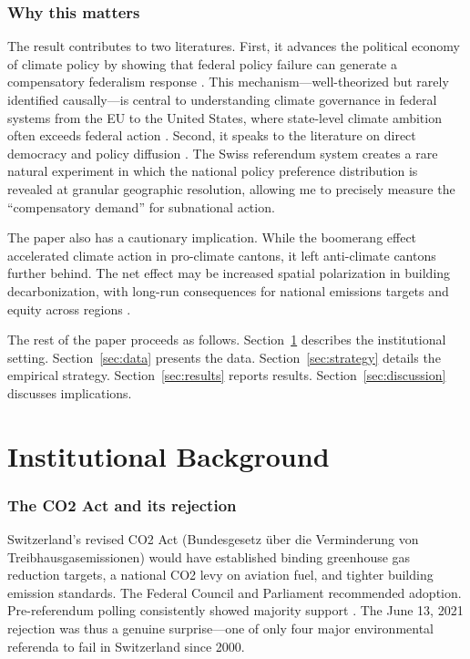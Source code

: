 \documentclass[12pt]{article}
\begin{document}
\subsubsection*{Why this matters} The result contributes to two literatures. First, it advances the political economy of climate policy by showing that federal policy failure can generate a compensatory federalism response \citep{rabe2004statehouse, lutsey2008assessment, goulder2020climate}. This mechanism---well-theorized but rarely identified causally---is central to understanding climate governance in federal systems from the EU to the United States, where state-level climate ambition often exceeds federal action \citep{byrne2007american, jotzo2018carbon}. Second, it speaks to the literature on direct democracy and policy diffusion \citep{matsusaka2004direct, shipan2008mechanisms}. The Swiss referendum system creates a rare natural experiment in which the national policy preference distribution is revealed at granular geographic resolution, allowing me to precisely measure the ``compensatory demand'' for subnational action.

The paper also has a cautionary implication. While the boomerang effect accelerated climate action in pro-climate cantons, it left anti-climate cantons further behind. The net effect may be increased spatial polarization in building decarbonization, with long-run consequences for national emissions targets and equity across regions \citep{hochstetler2021climate}.

The rest of the paper proceeds as follows. Section~\ref{sec:background} describes the institutional setting. Section~\ref{sec:data} presents the data. Section~\ref{sec:strategy} details the empirical strategy. Section~\ref{sec:results} reports results. Section~\ref{sec:discussion} discusses implications.


\section{Institutional Background}
\label{sec:background}

\subsubsection*{The CO2 Act and its rejection} Switzerland's revised CO2 Act (Bundesgesetz \"uber die Verminderung von Treibhausgasemissionen) would have established binding greenhouse gas reduction targets, a national CO2 levy on aviation fuel, and tighter building emission standards. The Federal Council and Parliament recommended adoption. Pre-referendum polling consistently showed majority support \citep{vatter2022swiss}. The June 13, 2021 rejection was thus a genuine surprise---one of only four major environmental referenda to fail in Switzerland since 2000.
\end{document}

